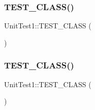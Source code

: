 \subsubsection{\texorpdfstring{T\+E\+S\+T\+\_\+\+C\+L\+A\+S\+S()}{TEST\_CLASS()}\hspace{0.1cm}{\footnotesize\ttfamily [10/11]}}
{\footnotesize\ttfamily Unit\+Test1\+::\+T\+E\+S\+T\+\_\+\+C\+L\+A\+SS (\begin{DoxyParamCaption}\item[{Test\+Computer\+Evaluator}]{ }\end{DoxyParamCaption})}

\hypertarget{namespace_unit_test1_a1591fd2592b729138d235f98f5b6b79f}{}\label{namespace_unit_test1_a1591fd2592b729138d235f98f5b6b79f} 
\subsubsection{\texorpdfstring{T\+E\+S\+T\+\_\+\+C\+L\+A\+S\+S()}{TEST\_CLASS()}\hspace{0.1cm}{\footnotesize\ttfamily [11/11]}}
{\footnotesize\ttfamily Unit\+Test1\+::\+T\+E\+S\+T\+\_\+\+C\+L\+A\+SS (\begin{DoxyParamCaption}\item[{Test\+Computer\+Guesser}]{ }\end{DoxyParamCaption})}


